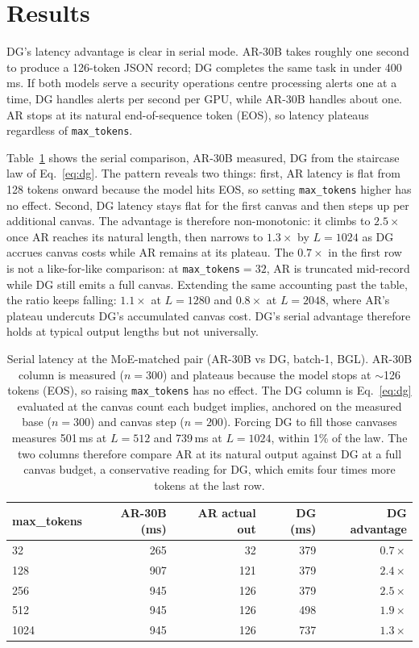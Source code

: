 \section{Results}
\label{sec:wins}

DG's latency advantage is clear in serial mode. AR-30B takes
roughly one second to produce a 126-token JSON record; DG completes the
same task in under 400\,ms. If both models serve a security operations
centre processing alerts one at a time, DG handles \crossoverLambda{}
alerts per second per GPU, while AR-30B handles about one. AR stops at
its natural end-of-sequence token (EOS), so latency plateaus regardless
of \texttt{max\_tokens}.

Table~\ref{tab:niche} shows the serial comparison, AR-30B measured,
DG from the staircase law of Eq.~\ref{eq:dg}. The pattern reveals two
things: first, AR latency is flat from 128 tokens onward because the
model hits EOS, so setting \texttt{max\_tokens} higher has no effect.
Second, DG latency stays flat for the first canvas and then steps up
per additional canvas. The advantage is therefore non-monotonic: it
climbs to $2.5\times$ once AR reaches its natural length, then narrows
to $1.3\times$ by $L{=}1024$ as DG accrues canvas costs while AR
remains at its plateau. The $0.7\times$ in the first row is not a
like-for-like comparison: at \texttt{max\_tokens}${=}32$, AR is
truncated mid-record while DG still emits a full canvas. Extending the
same accounting past the table, the ratio keeps falling: $1.1\times$ at
$L{=}1280$ and $0.8\times$ at $L{=}2048$, where AR's plateau undercuts
DG's accumulated canvas cost. DG's serial advantage therefore holds at
typical output lengths but not universally.

\begin{table}[h]
\centering
\caption{Serial latency at the MoE-matched pair (AR-30B vs DG,
batch-1, BGL). AR-30B column is measured ($n{=}300$) and plateaus
because the model stops at $\sim$126 tokens (EOS), so raising
\texttt{max\_tokens} has no effect. The DG column is
Eq.~\ref{eq:dg} evaluated at the canvas count each budget implies,
anchored on the measured base ($n{=}300$) and canvas step
($n{=}200$). Forcing DG to fill those canvases measures 501\,ms at
$L{=}512$ and 739\,ms at $L{=}1024$, within 1\% of the law. The two
columns therefore compare AR at its natural output against DG at a
full canvas budget, a conservative reading for DG, which emits four
times more tokens at the last row.}
\label{tab:niche}
\begin{tabular}{@{}lrrrr@{}}
\toprule
max\_tokens & AR-30B (ms) & AR actual out & DG (ms) & DG advantage \\
\midrule
32   & 265  & 32  & 379 & $0.7\times$ \\
128  & 907  & 121 & 379 & $2.4\times$ \\
256  & 945  & 126 & 379 & $2.5\times$ \\
512  & 945  & 126 & 498 & $1.9\times$ \\
1024 & 945  & 126 & 737 & $1.3\times$ \\
\bottomrule
\end{tabular}
\end{table}

